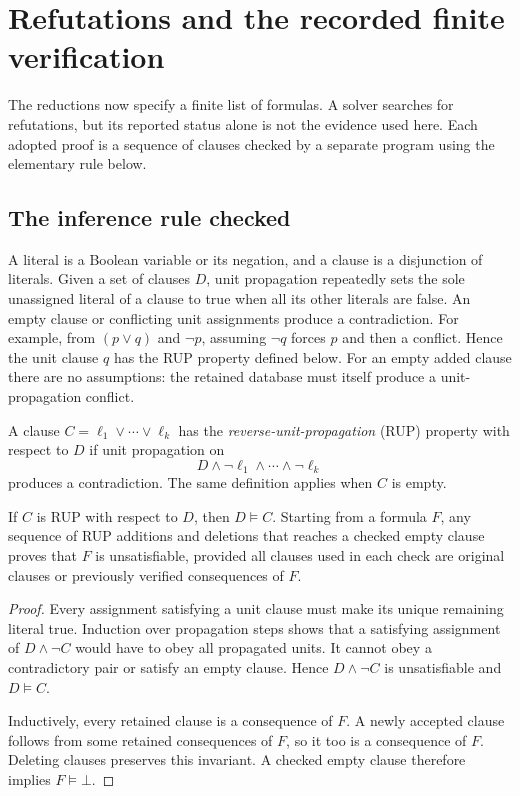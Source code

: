 \section{Refutations and the recorded finite verification}\label{sec:certificates}
The reductions now specify a finite list of formulas. A solver searches
for refutations, but its reported status alone is not the evidence used
here. Each adopted proof is a sequence of clauses checked by a separate
program using the elementary rule below.
\subsection{The inference rule checked}
A literal is a Boolean variable or its negation, and a clause is a
disjunction of literals. Given a set of clauses $D$, unit propagation
repeatedly sets the sole unassigned literal of a clause to true when all
its other literals are false. An empty clause or conflicting unit
assignments produce a contradiction.
For example, from $(p\lor q)$ and $\neg p$, assuming $\neg q$ forces
$p$ and then a conflict. Hence the unit clause $q$ has the RUP property
defined below. For an empty added clause there are no assumptions: the
retained database must itself produce a unit-propagation conflict.

\begin{definition}
A clause $C=\ell_1\lor\cdots\lor\ell_k$ has the
\emph{reverse-unit-propagation} (RUP) property with respect to $D$ if unit
propagation on
\[
D\land\neg\ell_1\land\cdots\land\neg\ell_k
\]
produces a contradiction. The same definition applies when $C$ is empty.
\end{definition}

\begin{lemma}\label{lem:rup}
If $C$ is RUP with respect to $D$, then $D\models C$. Starting from a
formula $F$, any sequence of RUP additions and deletions that reaches a
checked empty clause proves that $F$ is unsatisfiable, provided all clauses
used in each check are original clauses or previously verified consequences
of $F$.
\end{lemma}
\begin{proof}
Every assignment satisfying a unit clause must make its unique remaining
literal true. Induction over propagation steps shows that a satisfying
assignment of $D\land\neg C$ would have to obey all propagated units. It
cannot obey a contradictory pair or satisfy an empty clause. Hence
$D\land\neg C$ is unsatisfiable and $D\models C$.

Inductively, every retained clause is a consequence of $F$. A newly
accepted clause follows from some retained consequences of $F$, so it too
is a consequence of $F$. Deleting clauses preserves this invariant. A
checked empty clause therefore implies $F\models\bot$.
\end{proof}

